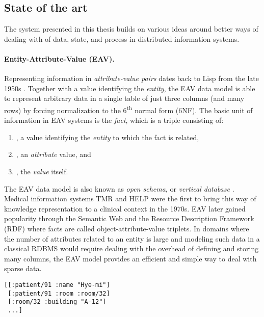 \subsection{State of the art}\label{sec:sota}

The system presented in this thesis builds on various ideas around better ways of dealing with of data, state, and process in distributed information systems.

\paragraph{Entity-Attribute-Value (EAV).}

Representing information in \emph{attribute-value pairs} dates back to Lisp from the late 1950s \cite{mccarthy1960recursive}. Together with a value identifying the \emph{entity}, the EAV data model is able to represent arbitrary data in a single table of just three columns (and many rows) by forcing normalization to the 6\textsuperscript{th} normal form (6NF). The basic unit of information in EAV systems is the \emph{fact}, which is a triple \lisp{[e a v]} consisting of:

\begin{enumerate}[nolistsep,label={(\roman*)}]
  \item {}, a value identifying the \emph{entity} to which the fact is related,
  \item {}, an \emph{attribute} value, and
  \item {}, the \emph{value} itself.
\end{enumerate}

The EAV data model is also known as \emph{open schema}, or \emph{vertical database} \cite{jastrow2015entity}. Medical information systems TMR \cite{stead1983chartless} and HELP \cite{huff1994help} were the first to bring this way of knowledge representation to a clinical context in the 1970s. EAV later gained popularity through the Semantic Web and the Resource Description Framework (RDF) \cite{decker2000semantic} where facts are called object-attribute-value triplets. In domains where the number of attributes related to an entity is large and modeling such data in a classical \gls{RDBMS} would require dealing with the overhead of defining and storing many columns, the EAV model provides an efficient and simple way to deal with sparse data.

\begin{lstlisting}[label={lst:examplefacts},morekeywords={patient,name,room,building},caption=A sequence of EAV facts]
[[:patient/91 :name "Hye-mi"]
 [:patient/91 :room :room/32]
 [:room/32 :building "A-12"]
 ...]
\end{lstlisting}

